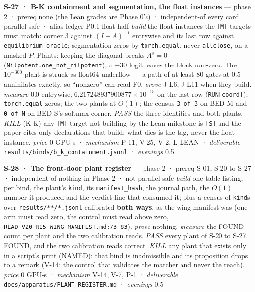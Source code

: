 \documentclass[11pt,a4paper]{article}
\newcounter{none}                 %
\theoremstyle{plain}
\theoremstyle{definition}
\theoremstyle{remark}
\begin{document}
\textbf{S-27 · B-K containment and segmentation, the float instances}
--- phase 2 · prereq none (the Lean grades are Phase 0's) ·
independent-of every card · parallel-safe · alias ledger P0.1 float half
\emph{build} the float instances the \texttt{{[}M{]}} targets must
match: corner 3 against \((I-A)^{-1}\) entrywise and its last row
against \texttt{equilibrium\_oracle}; segmentation zeros by
\texttt{torch.equal}, never \texttt{allclose}, on a masked \(P\).
Plants: keeping the diagonal breaks \(A^s=0\)
(\texttt{Nilpotent.one\_not\_nilpotent}); a \(-30\) logit leaves the
block non-zero. The \(10^{-300}\) plant is struck as float64 underflow
--- a path of at least 80 gates at \(0.5\) annihilates exactly, so
``nonzero'' can read F0. \emph{prove} J-L6, J-L11 when they build.
\emph{measure} \(0.0\) entrywise, \(6.217248937900877\times10^{-15}\) on
the last row (\texttt{RUN{[}coord{]}}); \texttt{torch.equal} zeros; the
two plants at \(O(1)\); the census \texttt{3\ of\ 3} on BED-M and
\texttt{0\ of\ N} on BED-S's softmax corner. \emph{PASS} the three
identities and both plants. \emph{KILL} (K-K) any \texttt{{[}M{]}}
target not building by the Lean milestone is \texttt{{[}S{]}} and the
paper cites only declarations that build; what dies is the tag, never
the float instance. \emph{price} \(0\) GPU-s · \emph{mechanism} P-11,
V-25, V-2, L-LEAN · \emph{deliverable}
\texttt{results/binds/b\_k\_containment.jsonl} · \emph{evenings} 0.5

\textbf{S-28 · The front-door plant register} --- phase 2 · prereq S-01,
S-20 to S-27 · independent-of nothing in Phase 2 · not parallel-safe
\emph{build} one table listing, per bind, the plant's \texttt{kind}, its
\texttt{manifest\_hash}, the journal path, the \(O(1)\) number it
produced and the verdict line that consumed it; plus a census of
\texttt{kind}s over \texttt{results/**/*.jsonl} calibrated \textbf{both
ways}, as the wing manifest was (one arm must read zero, the control
must read above zero, \texttt{READ\ V20\_R15\_WING\_MANIFEST.md:73-83}).
\emph{prove} nothing. \emph{measure} the FOUND count per plant and the
two calibration reads. \emph{PASS} every plant of S-20 to S-27 FOUND,
and the two calibration reads correct. \emph{KILL} any plant that exists
only in a script's print (NAMED): that bind is inadmissible and its
proposition drops to a remark (V-14: the control that validates the
matcher and never the reach). \emph{price} \(0\) GPU-s ·
\emph{mechanism} V-14, V-7, P-1 · \emph{deliverable}
\texttt{docs/apparatus/PLANT\_REGISTER.md} · \emph{evenings} 0.5
\end{document}
